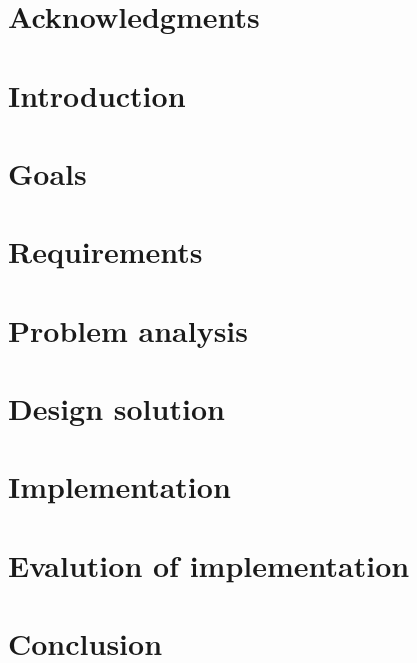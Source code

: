 \documentclass{article}
\begin{document}

\clearpage

\section*{Acknowledgments}
\clearpage

\tableofcontents
\clearpage

\section{Introduction}

\clearpage
\section{Goals}

\clearpage
\section{Requirements}

\clearpage
\section{Problem analysis}

\clearpage
\section{Design solution}

\clearpage
\section{Implementation}

\clearpage
\section{Evalution of implementation}

\clearpage
\section{Conclusion}

\clearpage
\end{document}
